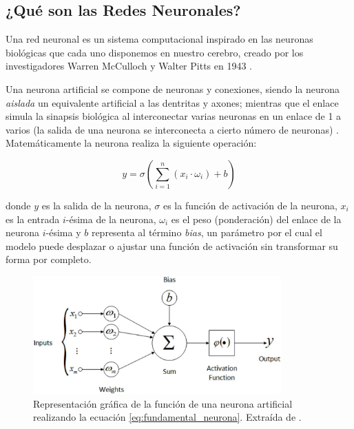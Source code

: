 \documentclass[../main.tex]{subfiles}
\begin{document}
\subsection{¿Qué son las Redes Neuronales?}

Una red neuronal es un sistema computacional inspirado en las neuronas biológicas que cada uno disponemos en nuestro cerebro, creado por los investigadores Warren McCulloch y Walter Pitts en 1943 \cite{PonceCruz2010}. \newline

Una neurona artificial se compone de neuronas y conexiones, siendo la neurona \textit{aislada} un equivalente artificial a las dentritas y axones; mientras que el enlace simula la sinapsis biológica al interconectar varias neuronas en un enlace de 1 a varios (la salida de una neurona se interconecta a cierto número de neuronas) \cite{SerradillaGarcia2016}. Matemáticamente la neurona realiza la siguiente operación:

\begin{equation}
    y = \sigma(\sum_{i=1}^{n}(x_{i}\cdot \omega_{i}) + b)
    \label{eq:fundamental_neurona}
\end{equation}

donde $y$ es la salida de la neurona, $\sigma$ es la función de activación de la neurona, $x_{i}$ es la entrada $i$-ésima de la neurona, $\omega_{i}$ es el peso (ponderación) del enlace de la neurona $i$-ésima y $b$ representa al término \textit{bias}, un parámetro por el cual el modelo puede desplazar o ajustar una función de activación sin transformar su forma por completo.

\begin{figure}[h]
    \centering
    \includegraphics[width=0.85\textwidth]{imagenes/Neurona.jpeg}
    \caption[Representación gráfica de la función de una neurona artificial.]{Representación gráfica de la función de una neurona artificial realizando la ecuación \ref{eq:fundamental_neurona}. Extraída de \cite{Mendoza2019}.}
    \label{fig:neurona_artificial_proceso}
\end{figure}
\end{document}
